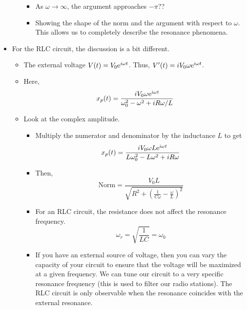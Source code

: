 \documentclass[../notes.tex]{subfiles}
\begin{document}
\begin{itemize}
\begin{itemize}
\begin{itemize}
            \item As $\omega\to\infty$, the argument approaches $-\pi$??
            \item Showing the shape of the norm and the argument with respect to $\omega$. This allows us to completely describe the resonance phenomena.
        \end{itemize}
    \end{itemize}
    \item For the RLC circuit, the discussion is a bit different.
    \begin{itemize}
        \item The external voltage $V(t)=V_0\e[i\omega t]$. Thus, $V'(t)=iV_0\omega\e[i\omega t]$.
        \item Here,
        \begin{equation*}
            x_p(t) = \frac{iV_0\omega\e[i\omega t]}{\omega_0^2-\omega^2+iR\omega/L}
        \end{equation*}
        \item Look at the complex amplitude.
        \begin{itemize}
            \item Multiply the numerator and denominator by the inductance $L$ to get
            \begin{equation*}
                x_p(t) = \frac{iV_0\omega L\e[i\omega t]}{L\omega_0^2-L\omega^2+iR\omega}
            \end{equation*}
            \item Then,
            \begin{equation*}
                \text{Norm} = \frac{V_0L}{\sqrt{R^2+\left( \frac{1}{C\omega}-\frac{\omega}{L} \right)^2}}
            \end{equation*}
            \item For an RLC circuit, the resistance does not affect the resonance frequency.
            \begin{equation*}
                \omega_r = \sqrt{\frac{1}{LC}} = \omega_0
            \end{equation*}
            \item If you have an external source of voltage, then you can vary the capacity of your circuit to ensure that the voltage will be maximized at a given frequency. We can tune our circuit to a very specific resonance frequency (this is used to filter our radio stations). The RLC circuit is only observable when the resonance coincides with the external resonance.
        \end{itemize}

\end{itemize}
\end{itemize}
\end{document}
